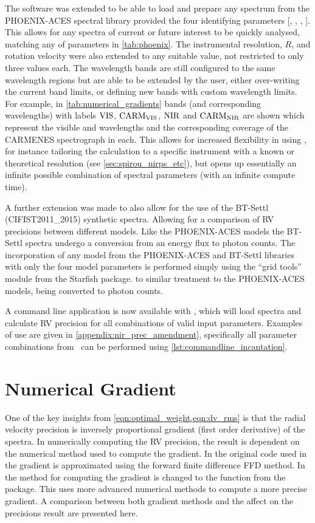 The software was extended to be able to load and prepare any spectrum from the {PHOENIX-ACES} spectral library provided the four identifying parameters [\Teff, \Logg, \feh{}, \alphafe{}].
This allows for any spectra of current or future interest to be quickly analysed, matching any of parameters in \cref{tab:phoenix}.
The instrumental resolution, \(R\), and rotation velocity \Vsini{} were also extended to any suitable value, not restricted to only three values each.
The \nir{} wavelength bands are still configured to the same wavelength regions but are able to be extended by the user, either over-writing the current band limits, or defining new bands with custom wavelength limits.
For example, in \cref{tab:numerical_gradients} bands (and corresponding wavelengths) with labels \({\rm VIS}\), \(\rm {CARM}_{VIS}\), \(\rm {NIR}\) and \(\rm {CARM}_{NIR}\) are shown which represent the visible and \nir{} wavelengths and the corresponding coverage of the {CARMENES} spectrograph in each.
This allows for increased flexibility in using \eniric{}, for instance tailoring the calculation to a specific instrument with a known or theoretical resolution (see \cref{sec:spirou_nirps_etc}), but opens up essentially an infinite possible combination of spectral parameters (with an infinite compute time).

A further extension was made to also allow for the use of the {BT-Settl} ({CIFIST2011\_2015}) synthetic spectra.
Allowing for a comparison of RV precisions between different models.
Like the {PHOENIX-ACES} models the {BT-Settl} spectra undergo a conversion from an energy flux to photon counts.
The incorporation of any model from the {PHOENIX-ACES} and {BT-Settl} libraries with only the four model parameters is performed simply using the ``grid tools'' module from the Starfish package\citep{czekala_constructing_2015}.
to similar treatment to the {PHOENIX-ACES} models, being converted to photon counts.

A command line application is now available with \eniric{}, which will load spectra and calculate RV precision for all combinations of valid input parameters.
Examples of use are given in \cref{appendix:nir_prec_amendment}, specifically all parameter combinations from~\citep{figueira_radial_2016} can be performed using \cref{lst:commandline_incantation}.


\section{Numerical Gradient}
\label{sec:numerical_gradient}
One of the key insights from \cref{eqn:optimal_weight,eqn:dv_rms} is that the radial velocity precision is inversely proportional gradient (first order derivative) of the spectra.
In numerically computing the {RV} precision, the result is dependent on the numerical method used to compute the gradient.
In the original code used in~\citet{figueira_radial_2016} the gradient is approximated using the forward finite difference {FFD} method.
In \eniric{} the method for computing the gradient is changed to the \npgradient{} function from the \numpy{} package.
This uses more advanced numerical methods to compute a more precise gradient.
A comparison between both gradient methods and the affect on the precisions result are presented here.

